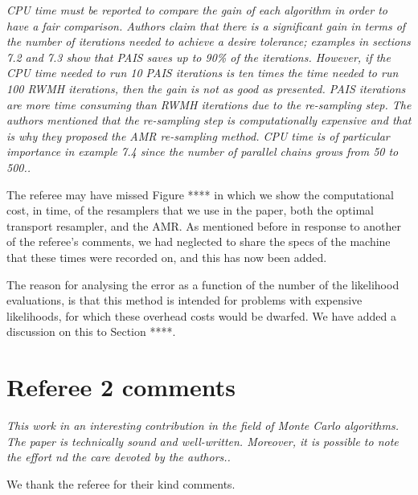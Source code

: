 \documentclass{article}
\newcommand{\comment}[2]{\vspace{0.6cm}{\bf Comment:} {\it #1.}

\vspace{0.3cm}{\bf Answer:} #2}
\begin{document}
\comment{CPU time must be reported to compare the gain of each algorithm in 
order to have a fair comparison. Authors claim that there is a significant 
gain in terms of the number of iterations needed to achieve a desire 
tolerance; examples in sections 7.2 and 7.3 show that PAIS saves up to 90\% of 
the iterations. However, if the CPU time needed to run 10 PAIS iterations is 
ten times the time needed to run 100 RWMH iterations, then the gain is not as 
good as presented. PAIS iterations are more time consuming than RWMH iterations 
due to the re-sampling step. The authors mentioned that the re-sampling step is 
computationally expensive and that is why they proposed the AMR re-sampling 
method. CPU time is of particular importance in example 7.4 since the number of 
parallel chains grows from 50 to 500.}{The referee may have missed Figure **** in which we show the computational cost, in time, of the resamplers that we use in the paper, both the optimal transport resampler, and the AMR. As mentioned before in response to another of the referee's comments, we had neglected to share the specs of the machine that these times were recorded on, and this has now been added. %

The reason for analysing the error as a function of the number of the likelihood evaluations, is that this method is intended for problems with expensive likelihoods, for which these overhead costs would be dwarfed. We have added a discussion on this to Section ****.}



\section*{Referee 2 comments}

\comment{This work in an interesting contribution in the field of Monte Carlo algorithms. The paper is technically sound and well-written. 
Moreover, it is possible to note the effort nd the care devoted by the authors.}{We thank the referee for their kind comments.}
\end{document}
